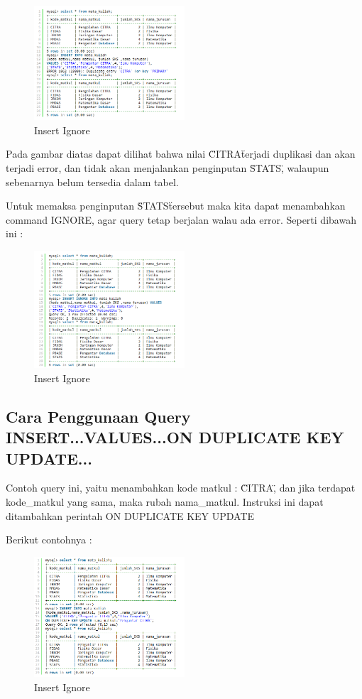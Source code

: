 		\begin{figure}[ht]
			\centerline{\includegraphics[width=0.5\textwidth]{figures/insert6.png}}
			\caption{Insert Ignore}
			\label{insert6}
			\end{figure}
			
	Pada gambar diatas dapat dilihat bahwa nilai \"CITRA\" terjadi duplikasi dan akan terjadi error, dan tidak akan menjalankan penginputan \"STATS\", walaupun sebenarnya belum tersedia dalam tabel.
	
	Untuk memaksa penginputan \"STATS\" tersebut  maka kita dapat menambahkan command IGNORE, agar query tetap berjalan walau ada error. Seperti dibawah ini :
	
		\begin{figure}[ht]
			\centerline{\includegraphics[width=0.5\textwidth]{figures/insert7.png}}
			\caption{Insert Ignore}
			\label{insert7}
			\end{figure}
			
	\subsection{Cara Penggunaan Query INSERT...VALUES...ON DUPLICATE KEY UPDATE...}
	Contoh query ini, yaitu menambahkan kode matkul : \"CITRA\" , dan jika terdapat kode_matkul yang sama, maka rubah nama_matkul. Instruksi ini dapat ditambahkan perintah ON DUPLICATE KEY UPDATE
	
	Berikut contohnya :
	
		\begin{figure}[ht]
			\centerline{\includegraphics[width=0.5\textwidth]{figures/insert8.png}}
			\caption{Insert Ignore}
			\label{insert8}
			\end{figure}
	

